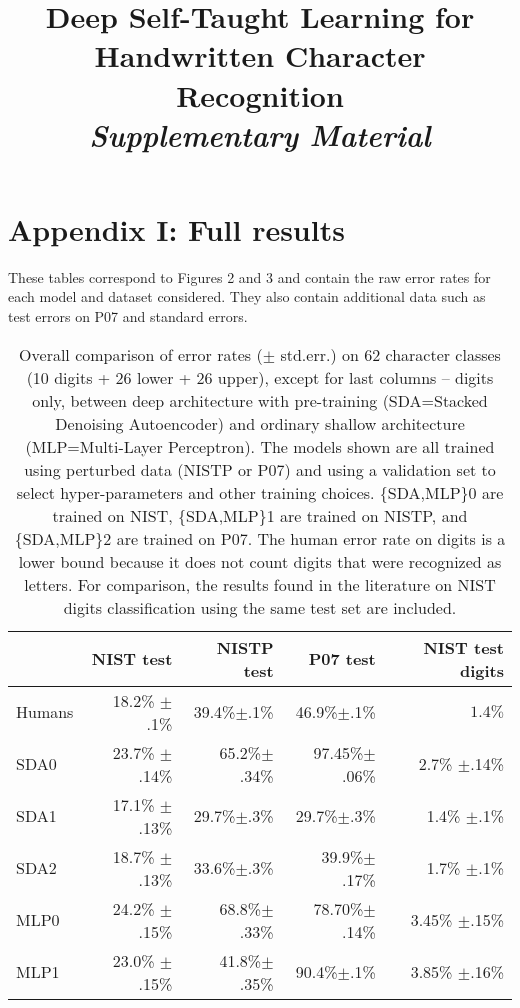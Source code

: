 \documentclass{article} %
\title{Deep Self-Taught Learning for Handwritten Character Recognition\\
\emph{Supplementary Material}}
\begin{document}
\maketitle

\section*{Appendix I: Full results}

These tables correspond to Figures 2 and 3 and contain the raw error rates for each model and dataset considered.
They also contain additional data such as test errors on P07 and standard errors.

\begin{table}[ht]
\caption{Overall comparison of error rates ($\pm$ std.err.) on 62 character classes (10 digits +
26 lower + 26 upper), except for last columns -- digits only, between deep architecture with pre-training
(SDA=Stacked Denoising Autoencoder) and ordinary shallow architecture 
(MLP=Multi-Layer Perceptron). The models shown are all trained using perturbed data (NISTP or P07)
and using a validation set to select hyper-parameters and other training choices. 
\{SDA,MLP\}0 are trained on NIST,
\{SDA,MLP\}1 are trained on NISTP, and \{SDA,MLP\}2 are trained on P07.
The human error rate on digits is a lower bound because it does not count digits that were
recognized as letters. For comparison, the results found in the literature
on NIST digits classification using the same test set are included.}
\label{tab:sda-vs-mlp-vs-humans}
\begin{center}
\begin{tabular}{|l|r|r|r|r|} \hline
      & NIST test          & NISTP test       & P07 test       & NIST test digits   \\ \hline
Humans&   18.2\% $\pm$.1\%   &  39.4\%$\pm$.1\%   &  46.9\%$\pm$.1\%  &  $1.4\%$ \\ \hline 
SDA0   &  23.7\% $\pm$.14\%  &  65.2\%$\pm$.34\%  & 97.45\%$\pm$.06\%  & 2.7\% $\pm$.14\%\\ \hline 
SDA1   &  17.1\% $\pm$.13\%  &  29.7\%$\pm$.3\%  & 29.7\%$\pm$.3\%  & 1.4\% $\pm$.1\%\\ \hline 
SDA2   &  18.7\% $\pm$.13\%  &  33.6\%$\pm$.3\%  & 39.9\%$\pm$.17\%  & 1.7\% $\pm$.1\%\\ \hline 
MLP0   &  24.2\% $\pm$.15\%  & 68.8\%$\pm$.33\%  & 78.70\%$\pm$.14\%  & 3.45\% $\pm$.15\% \\ \hline 
MLP1   &  23.0\% $\pm$.15\%  &  41.8\%$\pm$.35\%  & 90.4\%$\pm$.1\%  & 3.85\% $\pm$.16\% \\ \hline 

\end{tabular}
\end{center}
\end{table}
\end{document}
